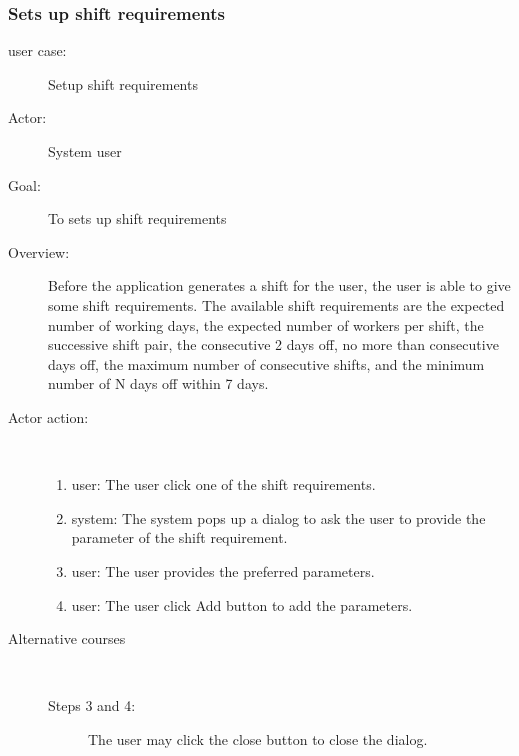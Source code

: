 \documentclass[11pt, oneside]{article}   	%
\begin{document}
\subsubsection{Sets up shift requirements}
\begin{description}
\item[user case:] Setup shift requirements
\item[Actor:] System user
\item[Goal:]To sets up shift requirements
\item[Overview:] Before the application generates a shift for the user, the user is able to give some shift requirements.
The available shift requirements are the expected number of working days, the expected number of workers per shift, the successive shift pair, the consecutive 2 days off,  no more than consecutive days off, the maximum number of consecutive shifts, and the minimum number of N days off within 7 days.
\item[Actor action:]
\
\begin{enumerate}
\item user: The user click one of the shift requirements.
\item system: The system pops up a dialog to ask the user to provide the parameter of the shift requirement.
\item user: The user provides the preferred parameters.
\item user: The user click Add button to add the parameters.
\end{enumerate}

\item[Alternative courses]
\
\begin{description}
\item[Steps 3 and 4:] The user may click the close button to close the dialog.
\end{description}

\end{description}
\end{document}
